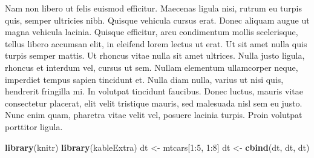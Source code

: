 \documentclass[]{article}
\newenvironment{Shaded}{\begin{snugshade}}{\end{snugshade}}
\newcommand{\KeywordTok}[1]{\textcolor[rgb]{0.13,0.29,0.53}{\textbf{{#1}}}}
\newcommand{\DataTypeTok}[1]{\textcolor[rgb]{0.13,0.29,0.53}{{#1}}}
\newcommand{\DecValTok}[1]{\textcolor[rgb]{0.00,0.00,0.81}{{#1}}}
\newcommand{\StringTok}[1]{\textcolor[rgb]{0.31,0.60,0.02}{{#1}}}
\newcommand{\NormalTok}[1]{{#1}}
\begin{document}
Nam non libero ut felis euismod efficitur. Maecenas ligula nisi, rutrum
eu turpis quis, semper ultricies nibh. Quisque vehicula cursus erat.
Donec aliquam augue ut magna vehicula lacinia. Quisque efficitur, arcu
condimentum mollis scelerisque, tellus libero accumsan elit, in eleifend
lorem lectus ut erat. Ut sit amet nulla quis turpis semper mattis. Ut
rhoncus vitae nulla sit amet ultrices. Nulla justo ligula, rhoncus et
interdum vel, cursus ut sem. Nullam elementum ullamcorper neque,
imperdiet tempus sapien tincidunt et. Nulla diam nulla, varius ut nisi
quis, hendrerit fringilla mi. In volutpat tincidunt faucibus. Donec
luctus, mauris vitae consectetur placerat, elit velit tristique mauris,
sed malesuada nisl sem eu justo. Nunc enim quam, pharetra vitae velit
vel, posuere lacinia turpis. Proin volutpat porttitor ligula.

\begin{Shaded}
\begin{Highlighting}[]
\KeywordTok{library}\NormalTok{(knitr)}
\KeywordTok{library}\NormalTok{(kableExtra)}
\NormalTok{dt <-}\StringTok{ }\NormalTok{mtcars[}\DecValTok{1}\NormalTok{:}\DecValTok{5}\NormalTok{, }\DecValTok{1}\NormalTok{:}\DecValTok{8}\NormalTok{]}
\NormalTok{dt <-}\StringTok{ }\KeywordTok{cbind}\NormalTok{(dt, dt, dt)}
\end{Highlighting}
\end{Shaded}

\begin{Shaded}
\end{Shaded}
\end{document}
